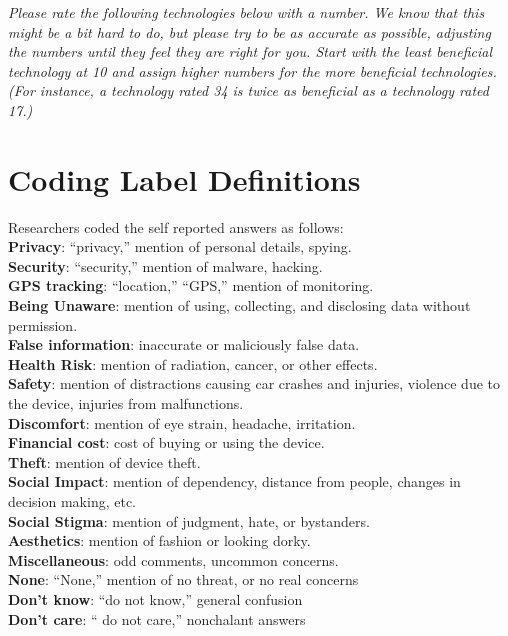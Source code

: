 \textit{Please rate the following technologies below with a number. We know that this might be a bit hard to do, but please try to be as accurate as possible, adjusting the numbers until they feel they are right for you. Start with the least beneficial technology at 10 and assign higher numbers for the more beneficial technologies. (For instance, a technology rated 34 is twice as beneficial as a technology rated 17.)}

\section{Coding Label Definitions}
\label{sec:coding}
Researchers coded the self reported answers as follows:\\
{\bf Privacy}: ``privacy,'' mention of personal details, spying. \\
{\bf Security}:  ``security,'' mention of malware, hacking. \\
{\bf GPS tracking}: ``location,'' ``GPS,'' mention of monitoring. \\
{\bf Being Unaware}: mention of using, collecting, and disclosing data without permission. \\
{\bf False information}: inaccurate or maliciously false data.\\
{\bf Health Risk}: mention of radiation, cancer, or other effects.\\
{\bf Safety}: mention of distractions causing car crashes and injuries, violence due to the device, injuries from malfunctions.\\
{\bf Discomfort}: mention of eye strain, headache, irritation. \\
{\bf Financial cost}: cost of buying or using the device. \\
{\bf Theft}: mention of device theft. \\
{\bf Social Impact}: mention of dependency, distance from people, changes in decision making, etc. \\
{\bf Social Stigma}: mention of judgment, hate, or bystanders.\\ 
{\bf Aesthetics}: mention of fashion or looking dorky. \\
{\bf Miscellaneous}: odd comments, uncommon concerns. \\
{\bf None}: ``None,'' mention of no threat, or no real concerns \\
{\bf Don't know}: ``do not know,'' general confusion \\
{\bf Don't care}: `` do not care,'' nonchalant answers 


